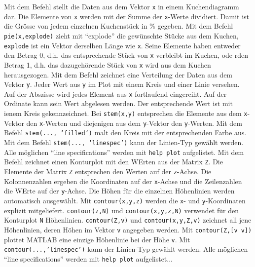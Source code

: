 \newline\newline
Mit dem Befehl  stellt die Daten aus dem Vektor \texttt{x} in einem Kuchendiagramm dar. Die Elemente von \texttt{x} werden mit der Summe der \texttt{x}-Werte dividiert. Damit ist die Grösse von jedem einzelnen Kuchenstück in \% gegeben. Mit dem Befehl {\color{red}\texttt{pie(x,explode)}} zieht mit ``explode'' die gewünschte Stücke aus dem Kuchen, \texttt{explode} ist ein Vektor derselben Länge wie \texttt{x}. Seine Elemente haben entweder den Betrag 0, d.h. das entsprechende Stück von \texttt{x} verbleibt im Kuchen, ode rden Betrag 1, d.h. das dazugehörende Stück von \texttt{x} wird aus dem Kuchen herausgezogen.
\newline\newline
Mit dem Befehl  zeichnet eine Verteilung der Daten aus dem Vektor \texttt{y}. Jeder Wert aus \texttt{y} im Plot mit einem Kreis und einer Linie versehen. Auf der Abszisse wird jedes Element aus \texttt{x} fortlaufend eingereiht. Auf der Ordinate kann sein Wert abgelesen werden. Der entsprechende Wert ist mit ienem Kreis gekennzeichnet. Bei {\color{red}\texttt{stem(x,y)}} entsprechen die Elemente aus dem \texttt{x}-Vektor den \texttt{x}-Werten und diejenigen aus dem \texttt{y}-Vektor den \texttt{y}-Werten. Mit dem Befehl {\color{red}\texttt{stem(..., 'filled')}} malt den Kreis mit der entsprechenden Farbe aus. Mit dem Befehl {\color{red}\texttt{stem(..., 'linespec')}} kann der Linien-Typ gewählt werden. Alle möglichen ``line specifications'' werden mit {\color{red}\texttt{help plot}} aufgelistet.
\newline\newline
Mit dem Befehl  zeichnet einen Konturplot mit den WErten aus der Matrix \texttt{Z}. Die Elemente der Matrix \texttt{Z} entsprechen den Werten auf der \texttt{z}-Achse. Die Kolonnenzahlen ergeben die Koordinaten auf der \texttt{x}-Achse und die Zeilenzahlen die WErte auf der \texttt{y}-Achse. Die Höhen für die einzelnen Höhenlinien werden automatisch ausgewählt. Mit {\color{red}\texttt{contour(x,y,z)}} werden die \texttt{x}- und \texttt{y}-Koordinaten explizit mitgeliefert. {\color{red}\texttt{contour(z,N)}} und {\color{red}\texttt{contour(x,y,z,N)}} verwendet für den Konturplot \texttt{N} Höhenlinien. {\color{red}\texttt{contour(Z,v)}} und {\color{red}\texttt{contour(x,y,Z,v)}} zeichnet all jene Höhenlinien, deren Höhen im Vektor \texttt{v} angegeben werden. Mit {\color{red}\texttt{contour(Z,[v v])}} plottet MATLAB eine einzige Höhenlinie bei der Höhe \texttt{v}. Mit {\color{red}\texttt{contour(...,'linespec')}} kann der Linien-Typ gewählt werden. Alle möglichen ``line specifications'' werden mit {\color{red}\texttt{help plot}} aufgelistet...
